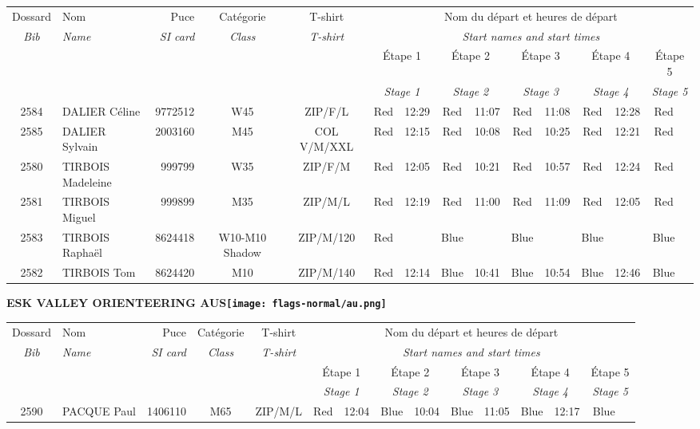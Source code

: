 \documentclass{report}
\begin{document}
  \begin{longtable}{|c|l|r|c|c|*{5}{cc|}}
    Dossard & Nom  & Puce    & Catégorie & T-shirt & \multicolumn{10}{c|}{Nom du départ et heures de départ} \\
    \itshape Bib     & \itshape Name & \itshape SI card & \itshape Class  & \itshape  T-shirt  & \multicolumn{10}{c|}{\itshape Start names and start times} \\
    \hline
    & & & & & \multicolumn{2}{c|}{Étape 1} & \multicolumn{2}{c|}{Étape 2} & \multicolumn{2}{c|}{Étape 3} & \multicolumn{2}{c|}{Étape 4} & \multicolumn{2}{c|}{Étape 5} \\
    & & & & & \multicolumn{2}{c|}{\itshape Stage 1} & \multicolumn{2}{c|}{\itshape Stage 2} & \multicolumn{2}{c|}{\itshape Stage 3} & \multicolumn{2}{c|}{\itshape Stage 4} & \multicolumn{2}{c|}{\itshape Stage 5} \\
    \hline
    2584 & DALIER Céline & 9772512 & W45 & ZIP/F/L & Red & 12:29 & Red & 11:07 & Red & 11:08 & Red & 12:28 & Red &  \\
    2585 & DALIER Sylvain & 2003160 & M45 & COL V/M/XXL & Red & 12:15 & Red & 10:08 & Red & 10:25 & Red & 12:21 & Red &  \\
    2580 & TIRBOIS Madeleine & 999799 & W35 & ZIP/F/M & Red & 12:05 & Red & 10:21 & Red & 10:57 & Red & 12:24 & Red &  \\
    2581 & TIRBOIS Miguel & 999899 & M35 & ZIP/M/L & Red & 12:19 & Red & 11:00 & Red & 11:09 & Red & 12:05 & Red &  \\
    2583 & TIRBOIS Raphaël & 8624418 & W10-M10 Shadow & ZIP/M/120 & Red &   & Blue &   & Blue &   & Blue &   & Blue &  \\
    2582 & TIRBOIS Tom & 8624420 & M10 & ZIP/M/140 & Red & 12:14 & Blue & 10:41 & Blue & 10:54 & Blue & 12:46 & Blue &  \\
  \end{longtable}
\newpage
  \Huge \centering \bfseries ESK VALLEY ORIENTEERING  AUS\normalfont \footnotesize \sffamily \hfill \texttt{[image: flags-normal/au.png]} \newline 
  \begin{longtable}{|c|l|r|c|c|*{5}{cc|}}
    Dossard & Nom  & Puce    & Catégorie & T-shirt & \multicolumn{10}{c|}{Nom du départ et heures de départ} \\
    \itshape Bib     & \itshape Name & \itshape SI card & \itshape Class  & \itshape  T-shirt  & \multicolumn{10}{c|}{\itshape Start names and start times} \\
    \hline
    & & & & & \multicolumn{2}{c|}{Étape 1} & \multicolumn{2}{c|}{Étape 2} & \multicolumn{2}{c|}{Étape 3} & \multicolumn{2}{c|}{Étape 4} & \multicolumn{2}{c|}{Étape 5} \\
    & & & & & \multicolumn{2}{c|}{\itshape Stage 1} & \multicolumn{2}{c|}{\itshape Stage 2} & \multicolumn{2}{c|}{\itshape Stage 3} & \multicolumn{2}{c|}{\itshape Stage 4} & \multicolumn{2}{c|}{\itshape Stage 5} \\
    \hline
    2590 & PACQUE Paul & 1406110 & M65 & ZIP/M/L & Red & 12:04 & Blue & 10:04 & Blue & 11:05 & Blue & 12:17 & Blue &  \\
  \end{longtable}
\end{document}
